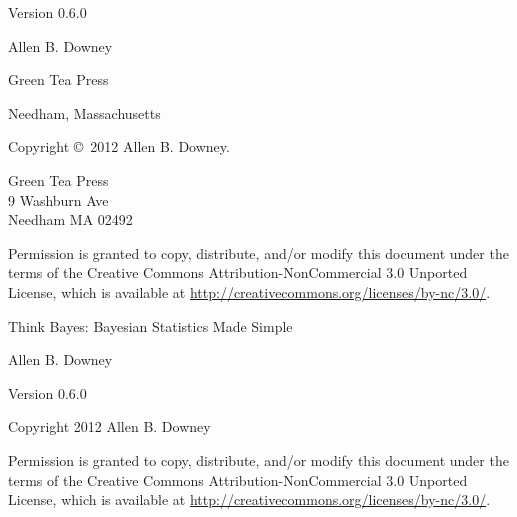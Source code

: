 \documentclass[12pt]{book}
\newcommand{\thetitle}{Think Bayes: Bayesian Statistics Made Simple}
\newcommand{\theversion}{0.6.0}
\begin{document}
\begin{latexonly}
\begin{flushright}
Version \theversion

\vspace{1in}


{\Large
Allen B. Downey\\
}


\vspace{0.5in}

{\Large Green Tea Press}

{\small Needham, Massachusetts}

\vfill

\end{flushright}


\pagebreak
\thispagestyle{empty}

Copyright \copyright ~2012 Allen B. Downey.


\vspace{0.2in}

\begin{flushleft}
Green Tea Press       \\
9 Washburn Ave \\
Needham MA 02492
\end{flushleft}

Permission is granted to copy, distribute, and/or modify this document
under the terms of the Creative Commons Attribution-NonCommercial 3.0 Unported
License, which is available at \url{http://creativecommons.org/licenses/by-nc/3.0/}.

\vspace{0.2in}

\end{latexonly}



\begin{htmlonly}


{\Large \thetitle}

{\large Allen B. Downey}

Version \theversion

\vspace{0.25in}

Copyright 2012 Allen B. Downey

\vspace{0.25in}

Permission is granted to copy, distribute, and/or modify this document
under the terms of the Creative Commons Attribution-NonCommercial 3.0
Unported License, which is available at
\url{http://creativecommons.org/licenses/by-nc/3.0/}.

\setcounter{chapter}{-1}

\end{htmlonly}
\end{document}
